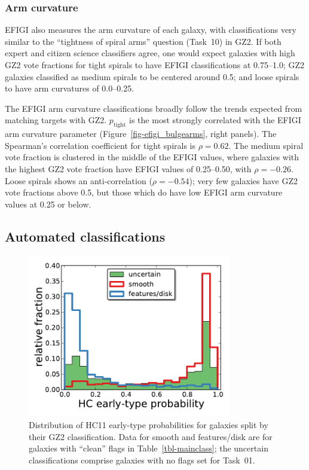 \documentclass[useAMS,usenatbib]{mn2e}
\begin{document}
\subsubsection{Arm curvature}

EFIGI also measures the arm curvature of each galaxy, with classifications very similar to the ``tightness of spiral arms'' question (Task~10) in GZ2. If both expert and citizen science classifiers agree, one would expect galaxies with high GZ2 vote fractions for tight spirals to have EFIGI classifications at 0.75--1.0; GZ2 galaxies classified as medium spirals to be centered around 0.5; and loose spirals to have arm curvatures of 0.0--0.25. 

The EFIGI arm curvature classifications broadly follow the trends expected from matching targets with GZ2. $p_\mathrm{tight}$ is the most strongly correlated with the EFIGI arm curvature parameter (Figure~\ref{fig-efigi_bulgearms}, right panels). The Spearman's correlation coefficient for tight spirals is $\rho=0.62$. The medium spiral vote fraction is clustered in the middle of the EFIGI values, where galaxies with the highest GZ2 vote fraction have EFIGI values of 0.25--0.50, with $\rho=-0.26$. Loose spirals shows an anti-correlation ($\rho=-0.54$); very few galaxies have GZ2 vote fractions above 0.5, but those which do have low EFIGI arm curvature values at 0.25 or below. 

\subsection{Automated classifications}

\begin{figure}
\includegraphics[angle=0,width=3.5in]{figures/hc_histogram.pdf}
\caption{Distribution of HC11 early-type probabilities for galaxies split by their GZ2 classification. Data for smooth and features/disk are for galaxies with ``clean'' flags in Table~\ref{tbl-mainclass}; the uncertain classifications comprise galaxies with no flags set for Task~01. 
\label{fig-hc_histogram}}
\end{figure}
\end{document}
